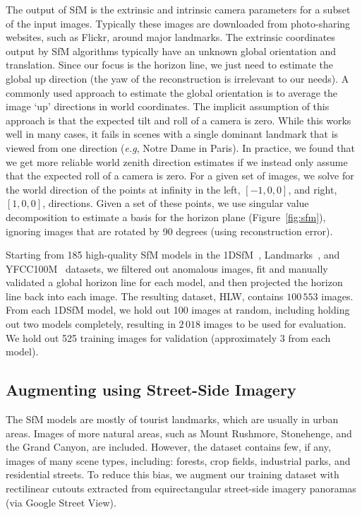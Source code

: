 \documentclass{bmvc2k}
\makeatletter
\newcommand{\figref}[1]{Figure~\ref{fig:#1}}
\newcommand*{\eg}{e.g.\@\xspace}
\def\eg{\emph{e.g}\bmvaOneDot}
\makeatother
\begin{document}
The output of SfM is the extrinsic and intrinsic camera parameters for
a subset of the input images. Typically these images are downloaded
from photo-sharing websites, such as Flickr, around major landmarks.
The extrinsic coordinates output by SfM algorithms typically have an
unknown global orientation and translation. Since our focus is the
horizon line, we just need to estimate the global up direction (the
yaw of the reconstruction is irrelevant to our needs).  A commonly
used 
approach to estimate the global orientation is to average the image
`up' directions in world coordinates.  The implicit assumption of this
approach is that the expected tilt and roll of a camera is zero.
While this works well in many cases, it fails in scenes with a single
dominant landmark that is viewed from one direction (\eg, Notre Dame
in Paris). 
In practice, we found that we get more reliable world zenith direction
estimates if we instead only assume that the expected roll of a camera
is zero. For a given set of images, we solve for the world direction of
the points at infinity in the left, $[-1,0,0]$, and right, $[1,0,0]$,
directions. Given a set of these points, we use singular value
decomposition to estimate a basis for the horizon plane
(\figref{sfm}), ignoring images that are rotated by 90 degrees (using
reconstruction error).

Starting from 185 high-quality SfM models in the
1DSfM~\cite{wilson2014robust}, Landmarks~\cite{li2012worldwide}, and
YFCC100M~\cite{heinly2015reconstructing} datasets, we filtered out
anomalous images, fit and manually validated a global horizon line for
each model, and then projected the horizon line back into each image. The
resulting dataset, HLW, contains $100\,553$ images. From
each 1DSfM model, we hold out 100 images at random, including holding
out two models completely, resulting in $2\,018$ images to be used for
evaluation. We hold out 525 training images for validation (approximately 3
from each model). 

\subsection{Augmenting using Street-Side Imagery}

The SfM models are mostly of tourist landmarks, which are usually in
urban areas. Images of more natural areas, such as Mount Rushmore,
Stonehenge, and the Grand Canyon, are included.  However, the dataset
contains few, if any, images of many scene types, including: forests,
crop fields, industrial parks, and residential streets. To reduce this
bias, we augment our training dataset with rectilinear cutouts
extracted from equirectangular street-side imagery panoramas (via
Google Street View).  
\end{document}
